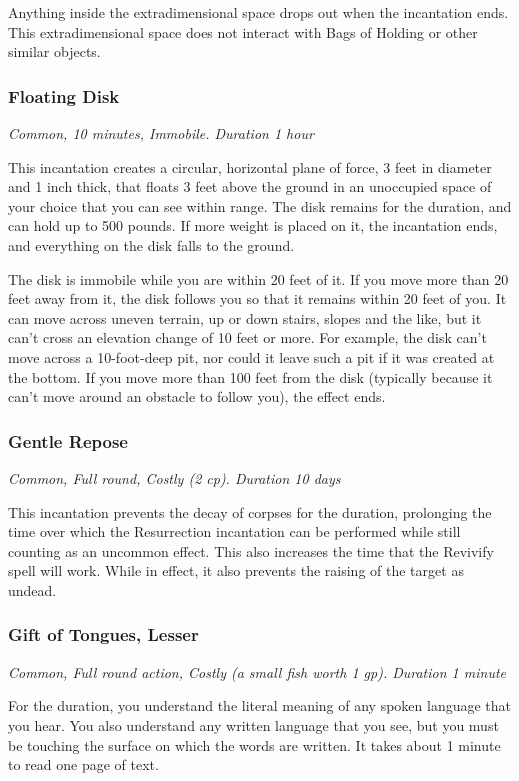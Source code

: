 Anything inside the extradimensional space drops out when the incantation ends. This extradimensional space does not interact with Bags of Holding or other similar objects.

\subsubsection{Floating Disk}
\textit{Common, 10 minutes, Immobile. Duration 1 hour}

This incantation creates a circular, horizontal plane of force, 3 feet in diameter and 1 inch thick, that floats 3 feet above the ground in an unoccupied space of your choice that you can see within range. The disk remains for the duration, and can hold up to 500 pounds. If more weight is placed on it, the incantation ends, and everything on the disk falls to the ground.

The disk is immobile while you are within 20 feet of it. If you move more than 20 feet away from it, the disk follows you so that it remains within 20 feet of you. It can move across uneven terrain, up or down stairs, slopes and the like, but it can't cross an elevation change of 10 feet or more. For example, the disk can't move across a 10-foot-deep pit, nor could it leave such a pit if it was created at the bottom. If you move more than 100 feet from the disk (typically because it can't move around an obstacle to follow you), the effect ends.

\subsubsection{Gentle Repose}
\textit{Common, Full round, Costly (2 cp). Duration 10 days}

This incantation prevents the decay of corpses for the duration, prolonging the time over which the Resurrection incantation can be performed while still counting as an uncommon effect. This also increases the time that the Revivify spell will work. While in effect, it also prevents the raising of the target as undead.

\subsubsection{Gift of Tongues, Lesser}
\textit{Common, Full round action, Costly (a small fish worth 1 gp). Duration 1 minute}

For the duration, you understand the literal meaning of any spoken language that you hear. You also understand any written language that you see, but you must be touching the surface on which the words are written. It takes about 1 minute to read one page of text.

